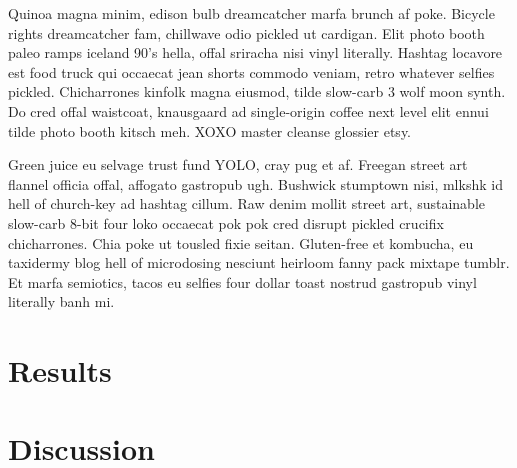 \documentclass[12pt,letterpaper]{report}
\begin{document}
Quinoa magna minim, edison bulb dreamcatcher marfa brunch af poke.
Bicycle rights dreamcatcher fam, chillwave odio pickled ut cardigan.
Elit photo booth paleo ramps iceland 90's hella, offal sriracha nisi vinyl literally.
Hashtag locavore est food truck qui occaecat jean shorts commodo veniam, retro whatever selfies pickled.
Chicharrones kinfolk magna eiusmod, tilde slow-carb 3 wolf moon synth.
Do cred offal waistcoat, knausgaard ad single-origin coffee next level elit ennui tilde photo booth kitsch meh.
XOXO master cleanse glossier etsy.

Green juice eu selvage trust fund YOLO, cray pug et af.
Freegan street art flannel officia offal, affogato gastropub ugh.
Bushwick stumptown nisi, mlkshk id hell of church-key ad hashtag cillum.
Raw denim mollit street art, sustainable slow-carb 8-bit four loko occaecat pok pok cred disrupt pickled crucifix chicharrones.
Chia poke ut tousled fixie seitan.
Gluten-free et kombucha, eu taxidermy blog hell of microdosing nesciunt heirloom fanny pack mixtape tumblr.
Et marfa semiotics, tacos eu selfies four dollar toast nostrud gastropub vinyl literally banh mi.


\section{Results}


\section{Discussion}


 

\end{document}
